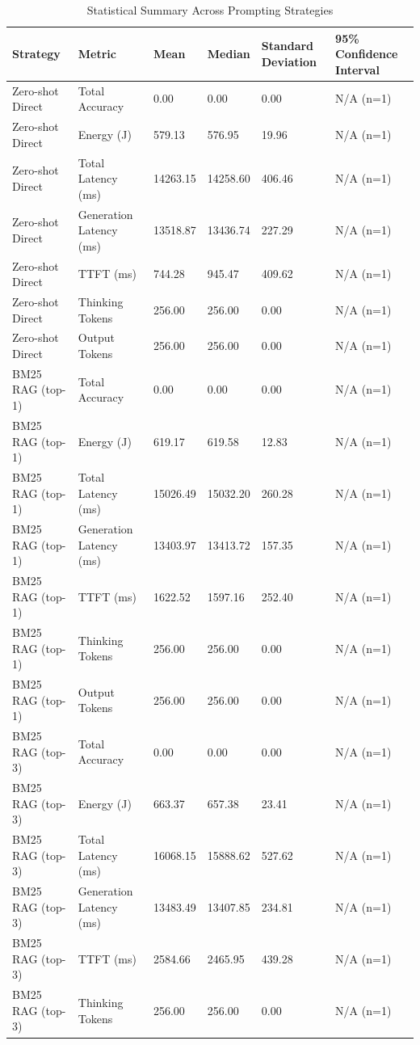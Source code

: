 \begin{table}
\caption{Statistical Summary Across Prompting Strategies}
\label{tab:statistical_summary}
\begin{tabular}{llllll}
\toprule
Strategy & Metric & Mean & Median & Standard Deviation & 95\% Confidence Interval \\
\midrule
Zero-shot Direct & Total Accuracy & 0.00 & 0.00 & 0.00 & N/A (n=1) \\
Zero-shot Direct & Energy (J) & 579.13 & 576.95 & 19.96 & N/A (n=1) \\
Zero-shot Direct & Total Latency (ms) & 14263.15 & 14258.60 & 406.46 & N/A (n=1) \\
Zero-shot Direct & Generation Latency (ms) & 13518.87 & 13436.74 & 227.29 & N/A (n=1) \\
Zero-shot Direct & TTFT (ms) & 744.28 & 945.47 & 409.62 & N/A (n=1) \\
Zero-shot Direct & Thinking Tokens & 256.00 & 256.00 & 0.00 & N/A (n=1) \\
Zero-shot Direct & Output Tokens & 256.00 & 256.00 & 0.00 & N/A (n=1) \\
BM25 RAG (top-1) & Total Accuracy & 0.00 & 0.00 & 0.00 & N/A (n=1) \\
BM25 RAG (top-1) & Energy (J) & 619.17 & 619.58 & 12.83 & N/A (n=1) \\
BM25 RAG (top-1) & Total Latency (ms) & 15026.49 & 15032.20 & 260.28 & N/A (n=1) \\
BM25 RAG (top-1) & Generation Latency (ms) & 13403.97 & 13413.72 & 157.35 & N/A (n=1) \\
BM25 RAG (top-1) & TTFT (ms) & 1622.52 & 1597.16 & 252.40 & N/A (n=1) \\
BM25 RAG (top-1) & Thinking Tokens & 256.00 & 256.00 & 0.00 & N/A (n=1) \\
BM25 RAG (top-1) & Output Tokens & 256.00 & 256.00 & 0.00 & N/A (n=1) \\
BM25 RAG (top-3) & Total Accuracy & 0.00 & 0.00 & 0.00 & N/A (n=1) \\
BM25 RAG (top-3) & Energy (J) & 663.37 & 657.38 & 23.41 & N/A (n=1) \\
BM25 RAG (top-3) & Total Latency (ms) & 16068.15 & 15888.62 & 527.62 & N/A (n=1) \\
BM25 RAG (top-3) & Generation Latency (ms) & 13483.49 & 13407.85 & 234.81 & N/A (n=1) \\
BM25 RAG (top-3) & TTFT (ms) & 2584.66 & 2465.95 & 439.28 & N/A (n=1) \\
BM25 RAG (top-3) & Thinking Tokens & 256.00 & 256.00 & 0.00 & N/A (n=1) \\

\end{tabular}
\end{table}
